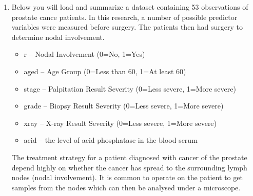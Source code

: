 \documentclass{article}\usepackage[]{graphicx}\usepackage[]{color}
\makeatletter
\newenvironment{kframe}{%
 \def\at@end@of@kframe{}%
 \ifinner\ifhmode%
  \def\at@end@of@kframe{\end{minipage}}%
  \begin{minipage}{\columnwidth}%
 \fi\fi%
 \def\FrameCommand##1{\hskip\@totalleftmargin \hskip-\fboxsep
 \colorbox{shadecolor}{##1}\hskip-\fboxsep
     \hskip-\linewidth \hskip-\@totalleftmargin \hskip\columnwidth}%
 \MakeFramed {\advance\hsize-\width
   \@totalleftmargin\z@ \linewidth\hsize
   \@setminipage}}%
 {\par\unskip\endMakeFramed%
 \at@end@of@kframe}
\newenvironment{knitrout}{}{} %
\makeatother
\begin{document}
\begin{enumerate}
\begin{enumerate}
\begin{knitrout}
\begin{kframe}
\end{kframe}
\end{knitrout}
  \end{enumerate}
  \newpage
\item Below you will load and summarize a dataset containing 53 observations of prostate cance patients.
In this research, a number of possible predictor variables were measured before surgery. The patients then 
had surgery to determine nodal involvement. 
  \begin{itemize}
    \item r -- Nodal Involvement (0=No, 1=Yes)
    \item aged	-- Age Group (0=Less than 60, 1=At least 60)
    \item stage -- Palpitation Result Severity (0=Less severe, 1=More severe)
    \item grade -- Biopsy Result Severity (0=Less severe, 1=More severe)
    \item xray -- X-ray Result Severity (0=Less severe, 1=More severe)
    \item acid -- the level of acid phosphatase in the blood serum
\end{itemize}
The treatment strategy for a patient diagnosed with cancer of the prostate depend highly on whether the cancer has spread to the surrounding lymph nodes (nodal involvement). It is common to operate on the patient to get samples from the nodes which can then be analysed under a microscope.


\end{enumerate}
\end{document}

